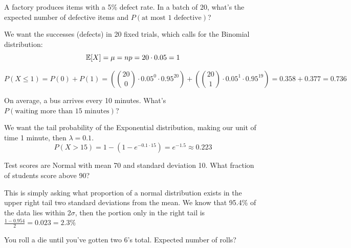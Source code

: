 \vspace{-2ex}

\begin{problem}
A factory produces items with a 5\% defect rate. In a batch of 20, what's the expected number of defective items and $P(\text{at most 1 defective})$?
\end{problem}

\begin{solution}
We want the successes (defects) in 20 fixed trials, which calls for the Binomial distribution:
\[
\mathbb{E}[X] = \mu = np = 20 \cdot 0.05 = 1
\]

\[
P(X \leq 1) = P(0) + P(1) = \left ( \binom{20}{0} \cdot 0.05^0 \cdot 0.95^{20} \right ) + \left ( \binom{20}{1} \cdot 0.05^1 \cdot 0.95^{19} \right ) = 0.358 + 0.377 = 0.736
\]
\end{solution}

\newpage

\begin{problem}
On average, a bus arrives every 10 minutes. What's $P(\text{waiting more than 15 minutes})$?
\end{problem}

\begin{solution}
We want the tail probability of the Exponential distribution, making our unit of time 1 minute, then $\lambda = 0.1$. 
\[
P(X > 15) = 1 - (1 - e^{-0.1 \cdot 15}) = e^{-1.5} \approx 0.223
\]
\end{solution}

\vspace{-2ex}

\begin{problem}
Test scores are Normal with mean 70 and standard deviation 10. What fraction of students score above 90?
\end{problem}

\begin{solution}
This is simply asking what proportion of a normal distribution exists in the upper right tail two standard deviations from the mean. We know that 95.4\% of the data lies within 2$\sigma$, then the portion only in the right tail is $\frac{1-0.954}{2} = 0.023 = 2.3\%$
\end{solution}

\vspace{-1ex}

\begin{problem}
You roll a die until you've gotten two 6's total. Expected number of rolls?
\end{problem}

